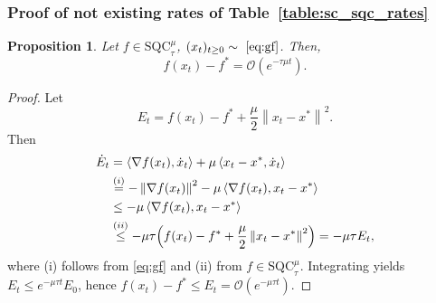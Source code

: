 \documentclass{article}
\def\xcont{(x_t)_{t\ge 0}}
\newcommand{\bpar}[1]{\left(#1\right)}
\newcommand{\norm}[1]{\left\lVert#1\right\rVert}
\newcommand{\dotprod}[1]{\left< #1\right>}
\newcommand{\grad}[1]{\nabla f(#1)}
\newcommand{\sqc}{\text{SQC}_{\tau}^{\mu}}
\newcommand{\bigO}{\mathcal{O}}
\theoremstyle{plain}
\newtheorem{proposition}[theorem]{Proposition}
\theoremstyle{definition}
\theoremstyle{remark}
\begin{document}
\subsubsection{Proof of not existing rates of Table~\ref{table:sc_sqc_rates}}\label{app:table_proof}
\begin{proposition}\label{prop:gf_sqc}
Let $f\in\sqc$, $\xcont\sim~\eqref{eq:gf}$. Then,
\[
f(x_t)-f^\ast = \bigO(e^{-\tau \mu t}).
\]
\end{proposition}
\begin{proof}
Let
\[
E_t =f(x_t)-f^\ast + \frac{\mu}{2}\norm{x_t-x^\ast}^2.
\]
Then
\begin{align*}
\dot E_t
&= \dotprod{\grad{x_t},\dot x_t} + \mu \dotprod{x_t-x^\ast,\dot x_t}\\
&\overset{(i)}= -\norm{\grad{x_t}}^2 - \mu\dotprod{\grad{x_t},x_t-x^\ast}\\
&\le - \mu\dotprod{\grad{x_t},x_t-x^\ast}\\
&\overset{(ii)}\le -\mu \tau\Bigl(f(x_t)-f^\ast + \frac{\mu}{2}\norm{x_t-x^\ast}^2\Bigr)
= -\mu\tau E_t,
\end{align*}
where (i) follows from \eqref{eq:gf} and (ii) from $f\in\sqc$.
Integrating yields $E_t\le e^{-\mu\tau t}E_0$, hence $f(x_t)-f^\ast\le E_t=\bigO(e^{-\mu\tau t})$.
\end{proof}
\end{document}
